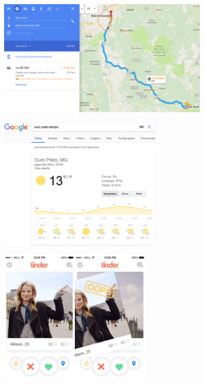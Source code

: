 	\begin{frame}
		\begin{figure}
			\centering
			\includegraphics[width=0.90\textwidth]{img/localizacao_2.png}
		\end{figure}
	\end{frame}
	
	\begin{frame}
		\begin{figure}
			\centering
			\includegraphics[width=0.7\textwidth]{img/localizacao_4.png}
		\end{figure}
	\end{frame}
	
	\begin{frame}
		\begin{figure}
			\centering
			\includegraphics[width=0.65\textwidth]{img/localizacao_3.jpg}
		\end{figure}
	\end{frame}
	
